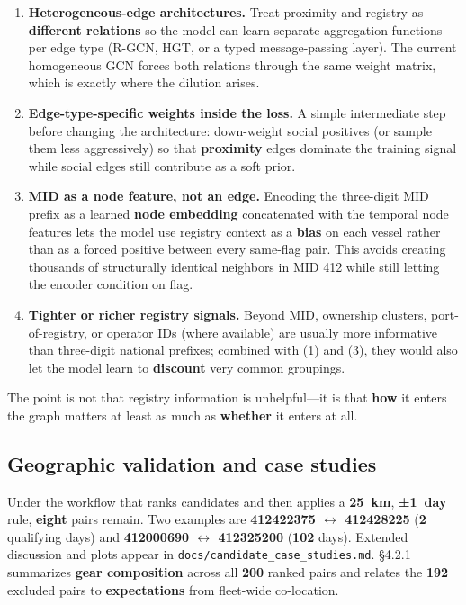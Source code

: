 \documentclass[
]{article}
\providecommand{\tightlist}{%
  \setlength{\itemsep}{0pt}\setlength{\parskip}{0pt}}
\begin{document}
\begin{enumerate}
\def\labelenumi{\arabic{enumi}.}
\tightlist
\item
  \textbf{Heterogeneous-edge architectures.} Treat proximity and
  registry as \textbf{different relations} so the model can learn
  separate aggregation functions per edge type (R-GCN, HGT, or a typed
  message-passing layer). The current homogeneous GCN forces both
  relations through the same weight matrix, which is exactly where the
  dilution arises.
\item
  \textbf{Edge-type-specific weights inside the loss.} A simple
  intermediate step before changing the architecture: down-weight social
  positives (or sample them less aggressively) so that
  \textbf{proximity} edges dominate the training signal while social
  edges still contribute as a soft prior.
\item
  \textbf{MID as a node feature, not an edge.} Encoding the three-digit
  MID prefix as a learned \textbf{node embedding} concatenated with the
  temporal node features lets the model use registry context as a
  \textbf{bias} on each vessel rather than as a forced positive between
  every same-flag pair. This avoids creating thousands of structurally
  identical neighbors in MID 412 while still letting the encoder
  condition on flag.
\item
  \textbf{Tighter or richer registry signals.} Beyond MID, ownership
  clusters, port-of-registry, or operator IDs (where available) are
  usually more informative than three-digit national prefixes; combined
  with (1) and (3), they would also let the model learn to
  \textbf{discount} very common groupings.
\end{enumerate}

The point is not that registry information is unhelpful---it is that
\textbf{how} it enters the graph matters at least as much as
\textbf{whether} it enters at all.

\subsection{Geographic validation and case
studies}\label{geographic-validation-and-case-studies}

Under the workflow that ranks candidates and then applies a
\textbf{25~km}, \textbf{±1~day} rule, \textbf{eight} pairs remain. Two
examples are \textbf{412422375 \(\leftrightarrow\) 412428225}
(\textbf{2} qualifying days) and \textbf{412000690 \(\leftrightarrow\)
412325200} (\textbf{102} days). Extended discussion and plots appear in
\texttt{docs/candidate\_case\_studies.md}. §4.2.1 summarizes
\textbf{gear composition} across all \textbf{200} ranked pairs and
relates the \textbf{192} excluded pairs to \textbf{expectations} from
fleet-wide co-location.
\end{document}
